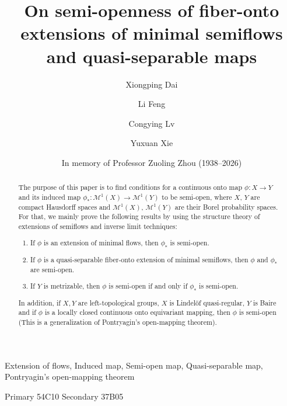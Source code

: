 \documentclass[12pt,final,3p,times]{elsarticle}
\theoremstyle{definition}
\numberwithin{equation}{section}
\begin{document}
\begin{frontmatter}
\title{On semi-openness of fiber-onto extensions of minimal semiflows and quasi-separable maps}

\author{Xiongping Dai}
\address{School of Mathematics, Nanjing University, Nanjing 210093, People's Republic of China}
\author{Li Feng}
\address{Department of Mathematics and Computer Science,
Albany State University,
Albany, Georgia 31705, USA}

\author{Congying Lv}
\author{Yuxuan Xie}
\address{School of Mathematics, Nanjing University, Nanjing 210093, People's Republic of China}

\author{In memory of Professor Zuoling Zhou (1938--2026)}
\begin{abstract}
The purpose of this paper is to find conditions for a continuous onto map $\phi\colon X\rightarrow Y$ and its induced map $\phi_*\colon\mathcal{M}^1(X)\rightarrow\mathcal{M}^1(Y)$  to be semi-open, where $X$, $Y$ are compact Hausdorff spaces and $\mathcal{M}^1(X)$, $\mathcal{M}^1(Y)$ are their Borel probability spaces. For that, we mainly prove the following results by using the structure theory of extensions of semiflows and inverse limit techniques:
\begin{enumerate}[(1)]
\item If $\phi$ is an extension of minimal flows, then $\phi_*$ is semi-open.
\item If $\phi$ is a quasi-separable fiber-onto extension of minimal semiflows, then $\phi$ and $\phi_*$ are semi-open.
\item If $Y$ is metrizable, then $\phi$ is semi-open if and only if $\phi_*$ is semi-open.
\end{enumerate}
In addition, if $X,Y$ are left-topological groups, $X$ is Lindel\"{o}f quasi-regular, $Y$ is Baire and if $\phi$ is a locally closed continuous onto equivariant mapping, then $\phi$ is semi-open (This is a generalization of Pontryagin's open-mapping theorem). 
\end{abstract}

\begin{keyword}
Extension of flows, Induced map, Semi-open map, Quasi-separable map,
Pontryagin's open-mapping theorem

\medskip
\MSC[2010] Primary 54C10 Secondary 37B05
\end{keyword}
\end{frontmatter}
\end{document}
